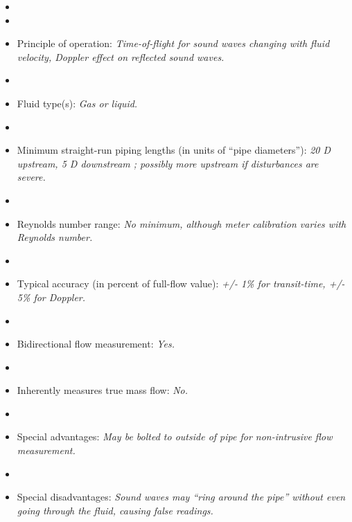 \documentclass[12pt,a4paper]{article}
\begin{document}
\begin{itemize}
\goodbreak
\item{} 
\vskip 5pt
\item\item{} Principle of operation: {\it Time-of-flight for sound waves changing with fluid velocity, Doppler effect on reflected sound waves.}
\vskip 5pt
\item\item{} Fluid type(s): {\it Gas or liquid.}
\vskip 5pt
\item\item{} Minimum straight-run piping lengths (in units of ``pipe diameters''): {\it 20 D upstream, 5 D downstream ; possibly more upstream if disturbances are severe.}
\vskip 5pt
\item\item{} Reynolds number range: {\it No minimum, although meter calibration varies with Reynolds number.}
\vskip 5pt
\item\item{} Typical accuracy (in percent of full-flow value): {\it +/- 1\% for transit-time, +/- 5\% for Doppler.}
\vskip 5pt
\item\item{} Bidirectional flow measurement: {\it Yes.}
\vskip 5pt
\item\item{} Inherently measures true mass flow: {\it No.}
\vskip 5pt
\item\item{} Special advantages: {\it May be bolted to outside of pipe for non-intrusive flow measurement.}
\vskip 5pt
\item\item{} Special disadvantages: {\it Sound waves may ``ring around the pipe'' without even going through the fluid, causing false readings.}
\end{itemize}
\end{document}
